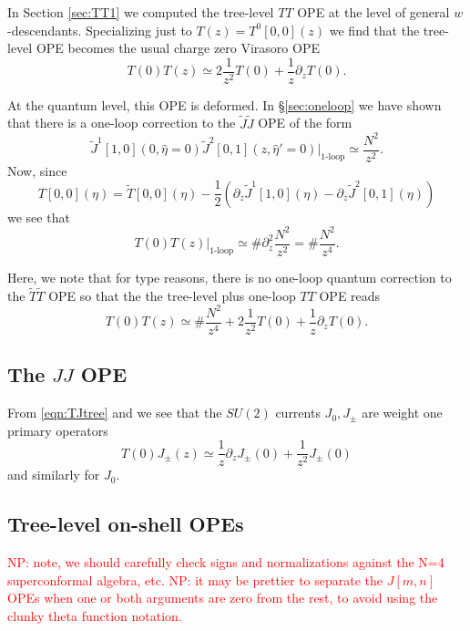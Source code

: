 \documentclass[11pt]{amsart}
\newcommand{\del}{\partial}
\newcommand{\what}{\widehat}
\newcommand{\til}{\widetilde}
\theoremstyle{thm}
\numberwithin{equation}{subsection}
\theoremstyle{def}
\theoremstyle{rem}
\begin{document}
In Section \ref{sec:TT1} we computed the tree-level $TT$ OPE at the level of general $w$-descendants.
Specializing just to $T (z) = T^0[0,0](z)$ we find that the tree-level OPE becomes the usual charge zero Virasoro OPE
\[
T(0) T(z) \simeq 2 \frac{1}{z^2} T(0) + \frac{1}{z} \partial_z T(0) .
\]

At the quantum level, this OPE is deformed. 
In \S \ref{sec:oneloop} we have shown that there is a one-loop correction to the $\til J \til J$ OPE of the form 
\[
\til J^{1}[1,0] (0, \what\eta = 0) \til J^{2} [0,1] (z, \what\eta'=0) |_{\text{1-loop}} \simeq \frac{N^2}{z^2} .
\]
Now, since 
\[
T[0,0] (\eta) = \til T[0,0] (\eta) - \frac12 \left(\del_z \til J^{1}[1,0] (\eta) - \del_z \til J^{2}[0,1] (\eta) \right) 
\]
we see that 
\[
T(0) T(z)|_{\text{1-loop}} \simeq \# \del_z^2 \frac{N^2}{z^2} = \# \frac{N^2}{z^4} .
\]

Here, we note that for type reasons, there is no one-loop quantum correction to the $\til T \til T$ OPE so that the the tree-level plus one-loop $TT$ OPE reads
\[
T(0) T(z) \simeq \# \frac{N^2}{z^4} + 2 \frac{1}{z^2} T(0) + \frac{1}{z} \partial_z T(0) .
\]


\subsection{The $JJ$ OPE } 

From \eqref{eqn:TJtree} and we see that the $SU(2)$ currents $J_0, J_\pm$ are weight one primary operators
\[
T(0) J_\pm (z) \simeq \frac1z \partial_z J_\pm (0) + \frac{1}{z^2} J_\pm (0) 
\]
and similarly for $J_0$. 

\subsection{Tree-level on-shell OPEs}
\textcolor{red}{NP: note, we should carefully check signs and normalizations against the N=4 superconformal algebra, etc.}
\textcolor{red}{NP: it may be prettier to separate the $J[m,n]$ OPEs when one or both arguments are zero from the rest, to avoid using the clunky theta function notation.}
\end{document}
